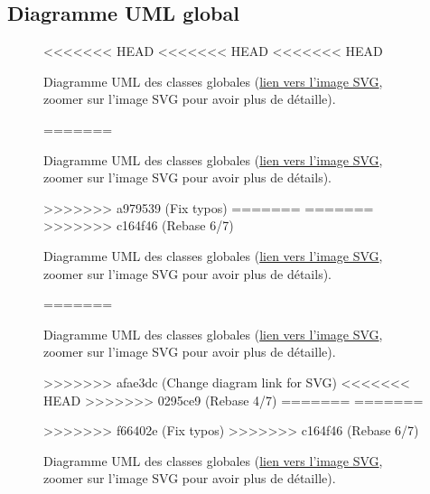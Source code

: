 \begin{appendices}
\section*{Diagramme UML global}\label{app:UMLGlobal}
\begin{figure}[!htbp]
	\center
<<<<<<< HEAD
<<<<<<< HEAD
<<<<<<< HEAD
	\caption{Diagramme UML des classes globales (\href{https://raw.githubusercontent.com/gabriel-combe/Cuttlefish_Tracker/main/rapport/UML/classes.svg}{lien vers l'image SVG}, zoomer sur l'image SVG pour avoir plus de détaille).}
=======
	\caption{Diagramme UML des classes globales (\href{https://raw.githubusercontent.com/gabriel-combe/Cuttlefish_Tracker/main/rapport/UML/classes.svg}{lien vers l'image SVG}, zoomer sur l'image SVG pour avoir plus de détails).}
>>>>>>> a979539 (Fix typos)
=======
=======
>>>>>>> c164f46 (Rebase 6/7)
	\caption{Diagramme UML des classes globales (\href{https://raw.githubusercontent.com/gabriel-combe/Cuttlefish_Tracker/main/rapport/UML/classes.svg}{lien vers l'image SVG}, zoomer sur l'image SVG pour avoir plus de détails).}
=======
	\caption{Diagramme UML des classes globales (\href{https://raw.githubusercontent.com/gabriel-combe/Cuttlefish_Tracker/test/rapport/UML/classes.svg}{lien vers l'image SVG}, zoomer sur l'image SVG pour avoir plus de détaille).}
>>>>>>> afae3dc (Change diagram link for SVG)
<<<<<<< HEAD
>>>>>>> 0295ce9 (Rebase 4/7)
=======
=======
	\caption{Diagramme UML des classes globales (\href{https://raw.githubusercontent.com/gabriel-combe/Cuttlefish_Tracker/main/rapport/UML/classes.svg}{lien vers l'image SVG}, zoomer sur l'image SVG pour avoir plus de détaille).}
>>>>>>> f66402e (Fix typos)
>>>>>>> c164f46 (Rebase 6/7)
	\label{fig:uml_diagram_classes}
\end{figure}
\FloatBarrier
	

\clearpage

\end{appendices}
